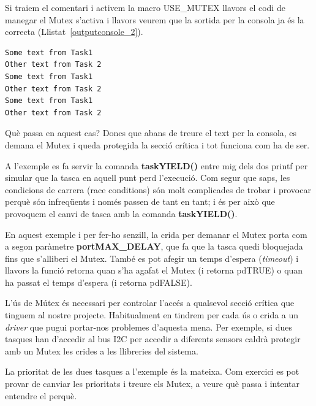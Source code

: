 Si traiem el comentari i activem la macro USE\_MUTEX llavors el codi de manegar el Mutex s'activa i llavors veurem que la sortida per la consola ja és la correcta (Llistat~\ref{outputconsole_2}).
\begin{lstlisting}[style=customc, label=outputconsole_2, caption=Sortida de la consola amb Mutex]
Some text from Task1
Other text from Task 2
Some text from Task1
Other text from Task 2
Some text from Task1
Other text from Task 2
\end{lstlisting}

Què passa en aquest cas? Doncs que abans de treure el text per la consola, es demana el Mutex i queda protegida la secció crítica i tot funciona com ha de ser.

A l'exemple es fa servir la comanda {\bf taskYIELD()} entre mig dels dos printf per simular que la tasca en aquell punt perd l'execució. Com segur que saps, les condicions de carrera (\glspl{race condition}) són molt complicades de trobar i provocar perquè són infreqüents i només passen de tant en tant; i és per això que provoquem el canvi de tasca amb la comanda {\bf taskYIELD()}.

En aquest exemple i per fer-ho senzill, la crida per demanar el Mutex porta com a segon paràmetre {\bf portMAX\_DELAY}, que fa que la tasca quedi bloquejada fins que s'alliberi el Mutex. També es pot afegir un temps d'espera ({\em timeout}) i llavors la funció retorna quan s'ha agafat el Mutex (i retorna \gls{pdTRUE}) o quan ha passat el temps d'espera (i retorna \gls{pdFALSE}).

L'ús de Mútex és necessari per controlar l'accés a qualsevol secció crítica que tinguem al nostre projecte. Habitualment en tindrem per cada ús o crida a un {\em driver} que pugui portar-nos problemes d'aquesta mena. Per exemple, si dues tasques han d'accedir al bus \gls{I2C} per accedir a diferents sensors caldrà protegir amb un Mutex les crides a les llibreries del sistema.

\begin{exercise}
La prioritat de les dues tasques a l'exemple és la mateixa. Com exercici es pot provar de canviar les prioritats i treure els Mutex, a veure què passa i intentar entendre el perquè.
\end{exercise}

